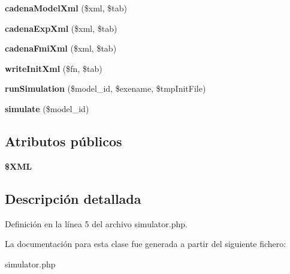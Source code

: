 \begin{DoxyCompactItemize}
\item 
\hypertarget{classsimulator_a52f49eb756fe2ee3238fccd1017bacb1}{{\bfseries cadena\-Model\-Xml} (\$xml, \$tab)}\label{classsimulator_a52f49eb756fe2ee3238fccd1017bacb1}

\item 
\hypertarget{classsimulator_a1a13b97820999ff1e9aedd046d03f8aa}{{\bfseries cadena\-Exp\-Xml} (\$xml, \$tab)}\label{classsimulator_a1a13b97820999ff1e9aedd046d03f8aa}

\item 
\hypertarget{classsimulator_a5d5ccd8544c32ebd959e09ca16133a0c}{{\bfseries cadena\-Fmi\-Xml} (\$xml, \$tab)}\label{classsimulator_a5d5ccd8544c32ebd959e09ca16133a0c}

\item 
\hypertarget{classsimulator_af9b860cbf6812dfb766be1bfe8b9e741}{{\bfseries write\-Init\-Xml} (\$fn, \$tab)}\label{classsimulator_af9b860cbf6812dfb766be1bfe8b9e741}

\item 
\hypertarget{classsimulator_a5167700851518332f76a993b14875364}{{\bfseries run\-Simulation} (\$model\-\_\-id, \$exename, \$tmp\-Init\-File)}\label{classsimulator_a5167700851518332f76a993b14875364}

\item 
\hypertarget{classsimulator_ac2a0fdfba4df28bdcd947e691e09eafd}{{\bfseries simulate} (\$model\-\_\-id)}\label{classsimulator_ac2a0fdfba4df28bdcd947e691e09eafd}

\end{DoxyCompactItemize}
\subsection*{\-Atributos públicos}
\begin{DoxyCompactItemize}
\item 
\hypertarget{classsimulator_acab8cf77a5b3f2863119c5a96f613785}{{\bfseries \$\-X\-M\-L}}\label{classsimulator_acab8cf77a5b3f2863119c5a96f613785}

\end{DoxyCompactItemize}


\subsection{\-Descripción detallada}


\-Definición en la línea 5 del archivo simulator.\-php.



\-La documentación para esta clase fue generada a partir del siguiente fichero\-:\begin{DoxyCompactItemize}
\item 
simulator.\-php\end{DoxyCompactItemize}
